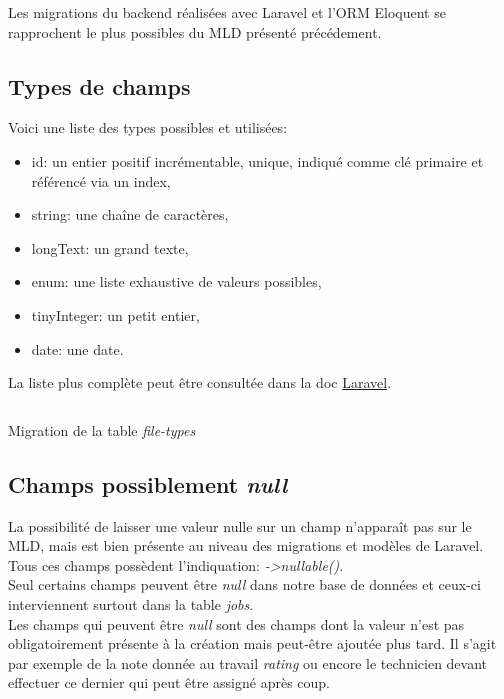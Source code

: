 \documentclass[
    iai, %
    il, %
]{heig-tb}
\begin{document}
Les migrations du backend réalisées avec Laravel et l'ORM Eloquent se rapprochent le plus possibles du MLD présenté précédement.

\subsection{Types de champs}
Voici une liste des types possibles et utilisées:
\begin{itemize}
    \item id: un entier positif incrémentable, unique, indiqué comme clé primaire et référencé via un index,
    \item string: une chaîne de caractères,
    \item longText: un grand texte,
    \item enum: une liste exhaustive de valeurs possibles,
    \item tinyInteger: un petit entier,
    \item date: une date.
\end{itemize}

La liste plus complète peut être consultée dans la doc \href{https://laravel.com/docs/9.x/migrations#available-column-types}{Laravel}.

\begin{listing}[h]
    \inputminted{php}{assets/code/16_create_jobs_table.php}
    \caption{Migration de la table \emph{file-types} \label{migrations-jobs}}
\end{listing}

\subsection{Champs possiblement \emph{null}}
La possibilité de laisser une valeur nulle sur un champ n'apparaît pas sur le MLD, mais est bien présente au niveau des migrations et modèles de Laravel.\\
Tous ces champs possèdent l'indiquation: \emph{->nullable()}.\\
Seul certains champs peuvent être \emph{null} dans notre base de données et ceux-ci interviennent surtout dans la table \emph{jobs}.\\
Les champs qui peuvent être \emph{null} sont des champs dont la valeur n'est pas obligatoirement présente à la création mais peut-être ajoutée plus tard. Il s'agit par exemple de la note donnée au travail \emph{rating} ou encore le technicien devant effectuer ce dernier qui peut être assigné après coup.
\end{document}
